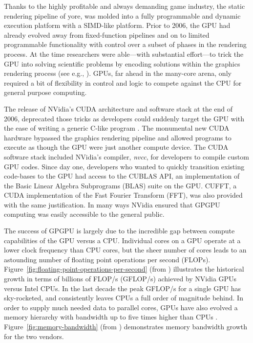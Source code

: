 \documentclass{report}
\begin{document}
Thanks to the highly profitable and always demanding game industry, the static rendering pipeline of yore, was molded into a fully programmable and dynamic execution platform with a SIMD-like platform. Prior to 2006, the GPU had already evolved away from fixed-function pipelines and on to limited programmable functionality with control over a subset of phases in the rendering process. At the time researchers were able---with substantial effort---to trick the GPU into solving scientific problems by encoding solutions within the graphics rendering process (see e.g., \cite{Harris2005,Owens2007}).
GPUs, far ahead in the many-core arena, only required a bit of flexibility in control and logic to compete against the CPU for general purpose computing.  

The release of NVidia's CUDA architecture and software stack at the end of 2006, deprecated those tricks as developers could suddenly target the GPU with the ease of writing a generic C-like program \cite{CudaGuide2013}. The monumental new CUDA hardware bypassed the graphics rendering pipeline and allowed programs to execute as though the GPU were just another compute device. The CUDA software stack included NVidia's compiler, \emph{nvcc}, for developers to compile custom GPU codes. Since day one, developers who wanted to quickly transition existing code-bases to the GPU had access to the CUBLAS API, an implementation of the Basic Linear Algebra Subprograms (BLAS) suite on the GPU. CUFFT, a CUDA implementation of the Fast Fourier Transform (FFT), was also provided with the same justification. In many ways NVidia ensured that GPGPU computing was easily accessible to the general public. 


The success of GPGPU is largely due to the incredible gap between compute capabilities of the GPU versus a CPU. Individual cores on a GPU operate at a lower clock frequency than CPU cores, but the sheer number of cores leads to an astounding number of floating point operations per second (FLOPs). Figure~\ref{fig:floating-point-operations-per-second} (from \cite{CudaGuide2013}) illustrates the historical growth in terms of billions of FLOP/s (GFLOP/s) achieved by NVidia GPUs versus Intel CPUs. In the last decade the peak GFLOP/s for a single GPU has sky-rocketed, and consistently leaves CPUs a full order of magnitude behind. In order to supply much needed data to parallel cores, GPUs have also evolved a memory hierarchy with bandwidth up to five times higher than CPUs \cite{CudaGuide2013}. Figure~\ref{fig:memory-bandwidth} (from \cite{CudaGuide2013}) demonstrates memory bandwidth growth for the two vendors. 
\end{document}
